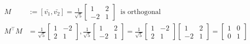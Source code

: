 {\begin{ex}
	\begin{align*}
	M &:= [\bar{v_1},\bar{v_2}] = \frac{1}{\sqrt{5}} \begin{bmatrix}
	1 & 2 \\
	-2 & 1
	\end{bmatrix} \;\; \text{is orthogonal} \\
	M^\top M &= \frac{1}{\sqrt{5}} \begin{bmatrix}
	1 & -2 \\
	2 & 1
	\end{bmatrix}, \frac{1}{\sqrt{5}} \begin{bmatrix}
	1 & 2 \\
	-2 & 1
	\end{bmatrix} = \frac{1}{\sqrt{5}} \begin{bmatrix}
	1 & -2 \\
	2 & 1
	\end{bmatrix} \begin{bmatrix}
	1 & 2 \\
	-2 & 1
	\end{bmatrix} = \begin{bmatrix}
	1 & 0 \\
	0 & 1
	\end{bmatrix}
	\end{align*}
\end{ex}
}






